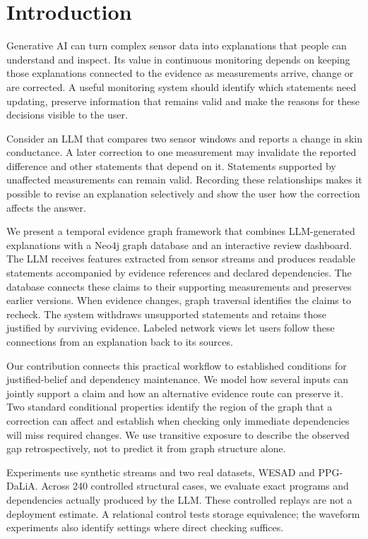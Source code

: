 \documentclass[runningheads]{llncs}
\newcommand{\SemCoreCases}{240}
\begin{document}
\section{Introduction}

Generative AI can turn complex sensor data into explanations that people can
understand and inspect. Its value in continuous monitoring depends on keeping
those explanations connected to the evidence as measurements arrive, change
or are corrected. A useful monitoring system should identify which statements
need updating, preserve information that remains valid and make the reasons
for these decisions visible to the user.

Consider an LLM that compares two sensor windows and reports a change in skin
conductance. A later correction to one measurement may invalidate the reported
difference and other statements that depend on it. Statements supported by
unaffected measurements can remain valid. Recording these relationships makes
it possible to revise an explanation selectively and show the user how the
correction affects the answer.

We present a temporal evidence graph framework that combines LLM-generated
explanations with a Neo4j graph database and an interactive review dashboard.
The LLM receives features extracted from sensor streams and produces readable
statements accompanied by evidence references and declared dependencies.
The database connects these claims to their supporting measurements and
preserves earlier versions. When evidence changes, graph traversal identifies
the claims to recheck. The system withdraws unsupported statements and retains
those justified by surviving evidence. Labeled network views let users follow
these connections from an explanation back to its sources.

Our contribution connects this practical workflow to established conditions
for justified-belief and dependency maintenance. We model how several inputs can jointly support
a claim and how an alternative evidence route can preserve it. Two standard
conditional properties identify the region of the graph that a correction can affect and
establish when checking only immediate dependencies will miss required changes.
We use transitive exposure to describe the observed gap retrospectively,
not to predict it from graph structure alone.

Experiments use synthetic streams and two real datasets, WESAD and PPG-DaLiA.
Across \SemCoreCases{} controlled structural cases, we evaluate exact programs
and dependencies actually produced by the LLM. These controlled replays are
not a deployment estimate. A relational control tests storage equivalence;
the waveform experiments also identify settings where direct checking suffices.
\end{document}
